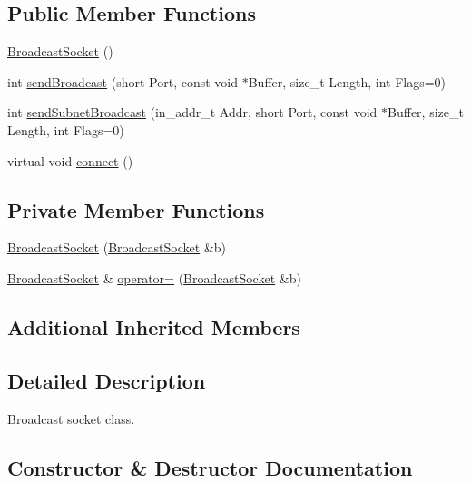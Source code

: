 \subsection*{Public Member Functions}
\begin{DoxyCompactItemize}
\item 
\hyperlink{classBroadcastSocket_a1d24d481f9947743896280d1f1c2cc8a}{Broadcast\+Socket} ()
\item 
int \hyperlink{classBroadcastSocket_a5e8f0ca3c127e9e5be5b6c994feb46ad}{send\+Broadcast} (short Port, const void $\ast$Buffer, size\+\_\+t Length, int Flags=0)
\item 
int \hyperlink{classBroadcastSocket_a184bc48d22498cb3a8c8de927cbae917}{send\+Subnet\+Broadcast} (in\+\_\+addr\+\_\+t Addr, short Port, const void $\ast$Buffer, size\+\_\+t Length, int Flags=0)
\item 
virtual void \hyperlink{classBroadcastSocket_a330f3448f2c53eef77af683cfd94eafd}{connect} ()
\end{DoxyCompactItemize}
\subsection*{Private Member Functions}
\begin{DoxyCompactItemize}
\item 
\hyperlink{classBroadcastSocket_a3f141e2a8c35c074ae18e8f6da272189}{Broadcast\+Socket} (\hyperlink{classBroadcastSocket}{Broadcast\+Socket} \&b)
\item 
\hyperlink{classBroadcastSocket}{Broadcast\+Socket} \& \hyperlink{classBroadcastSocket_adf79ba7c618dd87731908773e77bea8b}{operator=} (\hyperlink{classBroadcastSocket}{Broadcast\+Socket} \&b)
\end{DoxyCompactItemize}
\subsection*{Additional Inherited Members}


\subsection{Detailed Description}
Broadcast socket class. 

\subsection{Constructor \& Destructor Documentation}
\mbox{\label{classBroadcastSocket_a1d24d481f9947743896280d1f1c2cc8a}} 
